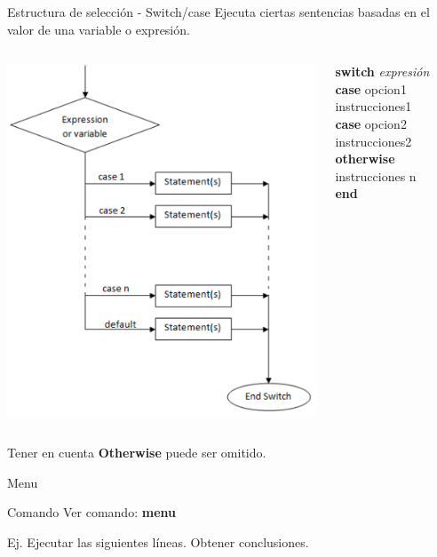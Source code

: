 \documentclass{bredelebeamer}
\begin{document}
\begin{frame}{Estructura de selección - Switch/case}
Ejecuta ciertas sentencias basadas en el valor de una variable o expresión.
\begin{columns}
\begin{column}{0.5\textwidth}
\begin{center}
\includegraphics[scale=0.2]{images/pantalla7.png}
\end{center}
\end{column}
\begin{column}{0.5\textwidth}
\textbf{switch} \textit{expresión}\\
   \textbf{case} opcion1\\
      instrucciones1\\
   \textbf{case} opcion2\\
      instrucciones2\\
   \textbf{otherwise}
      instrucciones n\\
\textbf{end}
\end{column}
\end{columns}

\begin{block}{Tener en cuenta}
\textbf{Otherwise} puede ser omitido.
\end{block}
\end{frame}

\begin{frame}{Menu}
\begin{exampleblock}{Comando}
Ver comando: \textbf{menu}
\end{exampleblock}

Ej. Ejecutar las siguientes líneas. Obtener conclusiones.
\end{frame}
\end{document}

